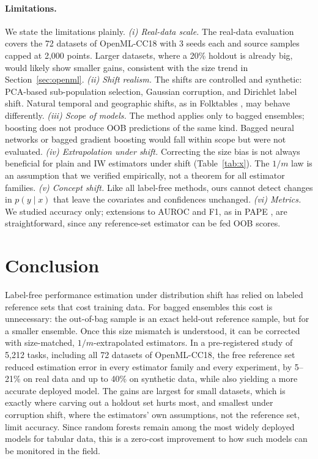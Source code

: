 \paragraph{Limitations.}
We state the limitations plainly.
\emph{(i) Real-data scale.} The real-data evaluation covers the 72 datasets of OpenML-CC18 with 3 seeds each and source samples capped at 2{,}000 points. Larger datasets, where a 20\% holdout is already big, would likely show smaller gains, consistent with the size trend in Section~\ref{sec:openml}.
\emph{(ii) Shift realism.} The shifts are controlled and synthetic: PCA-based sub-population selection, Gaussian corruption, and Dirichlet label shift. Natural temporal and geographic shifts, as in Folktables \citep{ding2021folktables}, may behave differently.
\emph{(iii) Scope of models.} The method applies only to bagged ensembles; boosting does not produce OOB predictions of the same kind. Bagged neural networks or bagged gradient boosting would fall within scope but were not evaluated.
\emph{(iv) Extrapolation under shift.} Correcting the size bias is not always beneficial for plain and IW estimators under shift (Table~\ref{tab:x}). The $1/m$ law is an assumption that we verified empirically, not a theorem for all estimator families.
\emph{(v) Concept shift.} Like all label-free methods, ours cannot detect changes in $p(y\mid x)$ that leave the covariates and confidences unchanged.
\emph{(vi) Metrics.} We studied accuracy only; extensions to AUROC and F1, as in PAPE \citep{bialek2025pape}, are straightforward, since any reference-set estimator can be fed OOB scores.

\section{Conclusion}
\label{sec:conclusion}

Label-free performance estimation under distribution shift has relied on labeled reference sets that cost training data. For bagged ensembles this cost is unnecessary: the out-of-bag sample is an exact held-out reference sample, but for a smaller ensemble. Once this size mismatch is understood, it can be corrected with size-matched, $1/m$-extrapolated estimators. In a pre-registered study of 5{,}212 tasks, including all 72 datasets of OpenML-CC18, the free reference set reduced estimation error in every estimator family and every experiment, by 5--21\% on real data and up to 40\% on synthetic data, while also yielding a more accurate deployed model. The gains are largest for small datasets, which is exactly where carving out a holdout set hurts most, and smallest under corruption shift, where the estimators' own assumptions, not the reference set, limit accuracy. Since random forests remain among the most widely deployed models for tabular data, this is a zero-cost improvement to how such models can be monitored in the field.

